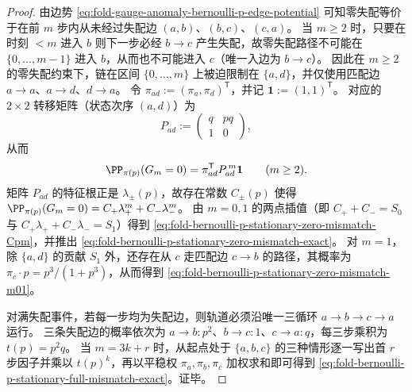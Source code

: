 \begin{proof}
由边势 \eqref{eq:fold-gauge-anomaly-bernoulli-p-edge-potential} 可知零失配等价于在前 \(m\) 步内从未经过失配边 \((a,b)\)、\((b,c)\)、\((c,a)\)。
当 \(m\ge 2\) 时，只要在时刻 \(<m\) 进入 \(b\) 则下一步必经 \(b\to c\) 产生失配，故零失配路径不可能在 \(\{0,\dots,m-1\}\) 进入 \(b\)，从而也不可能进入 \(c\)（唯一入边为 \(b\to c\)）。
因此在 \(m\ge 2\) 的零失配约束下，链在区间 \(\{0,\dots,m\}\) 上被迫限制在 \(\{a,d\}\)，并仅使用匹配边 \(a\to a\)、\(a\to d\)、\(d\to a\)。
令 \(\pi_{ad}:=(\pi_a,\pi_d)^{\mathsf T}\)，并记 \(\mathbf 1:=(1,1)^{\mathsf T}\)。
对应的 \(2\times 2\) 转移矩阵（状态次序 \((a,d)\)）为
\[
P_{ad}:=
\begin{pmatrix}
q & pq\\
1 & 0
\end{pmatrix},
\]
从而
\[
\PP_{\pi(p)}(G_m=0)=\pi_{ad}^{\mathsf T}P_{ad}^{\,m}\mathbf 1\qquad(m\ge 2).
\]
矩阵 \(P_{ad}\) 的特征根正是 \(\lambda_\pm(p)\)，故存在常数 \(C_\pm(p)\) 使得
\(\PP_{\pi(p)}(G_m=0)=C_+\lambda_+^m+C_-\lambda_-^m\)。
由 \(m=0,1\) 的两点插值（即 \(C_++C_-=S_0\) 与 \(C_+\lambda_++C_-\lambda_-=S_1\)）得到 \eqref{eq:fold-bernoulli-p-stationary-zero-mismatch-Cpm}，并推出 \eqref{eq:fold-bernoulli-p-stationary-zero-mismatch-exact}。
对 \(m=1\)，除 \(\{a,d\}\) 的贡献 \(S_1\) 外，还存在从 \(c\) 走匹配边 \(c\to b\) 的路径，其概率为 \(\pi_c\cdot p=p^3/(1+p^3)\)，从而得到 \eqref{eq:fold-bernoulli-p-stationary-zero-mismatch-m01}。

对满失配事件，若每一步均为失配边，则轨道必须沿唯一三循环 \(a\to b\to c\to a\) 运行。
三条失配边的概率依次为 \(a\to b:p^2\)、\(b\to c:1\)、\(c\to a:q\)，每三步乘积为 \(t(p)=p^2q\)。
当 \(m=3k+r\) 时，从起点处于 \(\{a,b,c\}\) 的三种情形逐一写出首 \(r\) 步因子并乘以 \(t(p)^k\)，再以平稳权 \(\pi_a,\pi_b,\pi_c\) 加权求和即可得到 \eqref{eq:fold-bernoulli-p-stationary-full-mismatch-exact}。证毕。
\end{proof}

